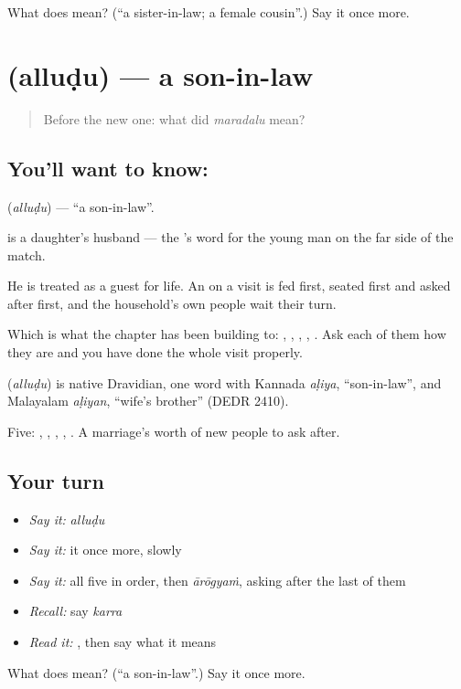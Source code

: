 \begin{tcolorbox}[breakable,colback=teal!4,colframe=teal!35!black,title={Before you move on}]
What does  mean? (\textquotedblleft{}a sister-in-law; a female cousin\textquotedblright{}.) Say it once more.
\end{tcolorbox}
\section[\texorpdfstring{\te{అల్లుడు} (alluḍu)}{అల్లుడు (alluḍu)}]{ (alluḍu) — a son-in-law}

\label{lesson:TE-C71-son-in-law}



\begin{quote}
Before the new one: what did \emph{maradalu} mean?
\end{quote}

\subsection*{You'll want to know: }
\textbf{} (\emph{alluḍu}) — \textquotedblleft{}a son-in-law\textquotedblright{}.

 is a daughter's husband — the 's word for the young man on the far side of the match.

He is treated as a guest for life. An  on a visit is fed first, seated first and asked after first, and the household's own people wait their turn.

Which is what the chapter has been building to: , , , , . Ask each of them how they are and you have done the whole visit properly.

\begin{cousinweb}
\textbf{} (\emph{alluḍu}) is native Dravidian, one word with Kannada \emph{aḷiya}, \textquotedblleft{}son-in-law\textquotedblright{}, and Malayalam \emph{aḷiyan}, \textquotedblleft{}wife's brother\textquotedblright{} (DEDR 2410).
\end{cousinweb}

\begin{grammarlens}[title={What you've built}]
Five: , , , , . A marriage's worth of new people to ask after.
\end{grammarlens}

\subsection*{Your turn}
\begin{itemize}
\raggedright
  \item \emph{Say it:} \emph{alluḍu}
  \item \emph{Say it:} it once more, slowly
  \item \emph{Say it:} all five in order, then \emph{ārōgyaṁ}, asking after the last of them
  \item \emph{Recall:} say \emph{karra}
  \item \emph{Read it:} \textbf{}, then say what it means
\end{itemize}

\begin{tcolorbox}[breakable,colback=teal!4,colframe=teal!35!black,title={Before you move on}]
What does  mean? (\textquotedblleft{}a son-in-law\textquotedblright{}.) Say it once more.
\end{tcolorbox}
